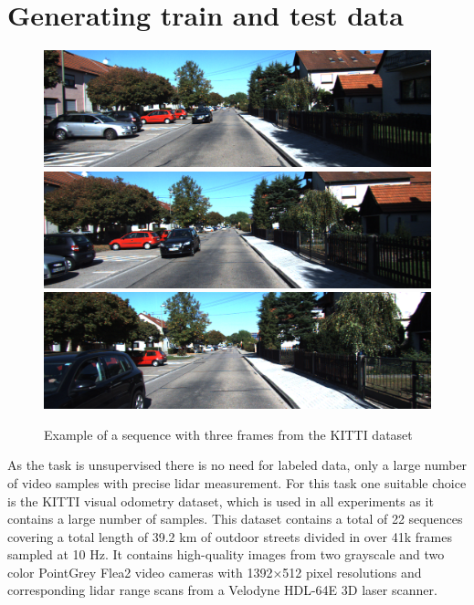 \section{Generating train and test data}
\begin{figure}[t]
\centering
\includegraphics[width=\textwidth]{images/img_first.png}
\includegraphics[width=\textwidth]{images/img_second.png}
\includegraphics[width=\textwidth]{images/img_third.png}
\caption{Example of a sequence with three frames from the KITTI dataset~\cite{geiger2012}}
\label{fig:frames}
\end{figure}

As the task is unsupervised there is no need for labeled data, only a large number of video samples with precise lidar measurement. For this task one suitable choice is the KITTI\cite{geiger2012} visual odometry dataset, which is used in all experiments as it contains a large number of samples. This dataset contains a total of 22 sequences covering a total length of 39.2 km of outdoor streets divided in over 41k frames sampled at 10 Hz. It contains high-quality images from two grayscale and two color PointGrey Flea2 video cameras with 1392×512 pixel resolutions and corresponding lidar range scans from a Velodyne HDL-64E 3D laser scanner.

